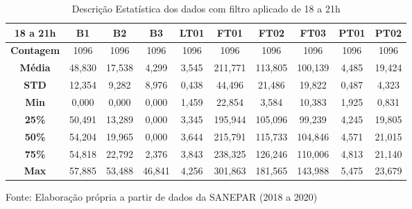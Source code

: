 \begin{table}[H]
	\centering
	\caption{Descrição Estatística dos dados com filtro aplicado de 18 a 21h}\label{tb:est}
	\begin{tabular}{@{}cccccccccc@{}}
		\toprule
		\textbf{18 a 21h}  & \textbf{B1} & \textbf{B2} & \textbf{B3} & \textbf{LT01} & \textbf{FT01} & \textbf{FT02} & \textbf{FT03} & \textbf{PT01} & \textbf{PT02} \\ \midrule
		\textbf{Contagem} & 1096        & 1096        & 1096        & 1096          & 1096          & 1096          & 1096          & 1096          & 1096          \\
		\textbf{Média}    & 48,830      & 17,538      & 4,299       & 3,545         & 211,771       & 113,805       & 100,139       & 4,485         & 19,424        \\
		\textbf{STD}      & 12,354      & 9,282       & 8,976       & 0,438         & 44,496        & 21,486        & 19,822        & 0,487         & 4,323         \\
		\textbf{Min}      & 0,000       & 0,000       & 0,000       & 1,459         & 22,854        & 3,584         & 10,383        & 1,925         & 0,831         \\
		\textbf{25\%}     & 50,491      & 13,289      & 0,000       & 3,345         & 195,944       & 105,096       & 99,239        & 4,245         & 19,805        \\
		\textbf{50\%}     & 54,204      & 19,965      & 0,000       & 3,644         & 215,791       & 115,733       & 104,846       & 4,571         & 21,015        \\
		\textbf{75\%}     & 54,818      & 22,792      & 2,376       & 3,843         & 238,325       & 126,246       & 110,006       & 4,813         & 21,140        \\
		\textbf{Max}      & 57,885      & 53,488      & 46,841      & 4,256         & 301,863       & 181,565       & 143,988       & 5,475         & 23,679        \\ \bottomrule
	\end{tabular}

	Fonte: Elaboração própria a partir de dados da SANEPAR (2018 a 2020)
\end{table}

